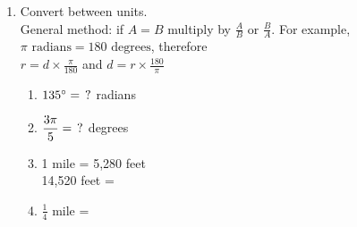 \begin{enumerate}
\item Convert between units. \\[0.25cm]
General method: if $A = B$ multiply by $\displaystyle \frac{A}{B} \text{ or } \frac{B}{A}$. For example, $\pi \text{ radians}= 180 \text{ degrees}$, therefore \\
$\displaystyle r = d \times \frac{\pi}{180}$ and 
$\displaystyle d = r \times \frac{180}{\pi}$
\vspace{0.5cm}
  \begin{multicols}{2}
  \raggedcolumns
  \begin{enumerate}[itemsep=2cm]
    \item $135^\circ = \hspace{0.15cm} ?$ radians
    \item $\displaystyle \frac{3\pi}{5}  = \hspace{0.15cm} ?$ degrees
    \item 1 mile = 5,280 feet\\[0.5cm]
    14,520 feet = 
    \item $\displaystyle \frac{1}{4}$ mile =   
  \end{enumerate}
  \end{multicols}


\end{enumerate}
